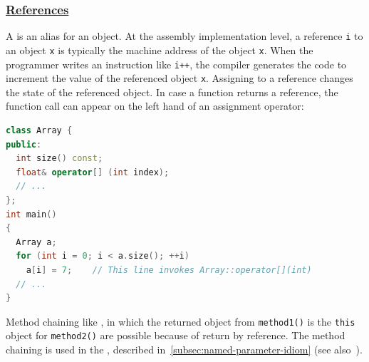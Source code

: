 \subsubsection{\href{https://isocpp.org/wiki/faq/references}{References}}
A  is an alias for an object. At the assembly 
implementation level, a reference \texttt{i} to an object \texttt{x} is 
typically the machine address of the object \texttt{x}. When the 
programmer writes an instruction like \texttt{i++}, the compiler generates 
the code to increment the value of the referenced object \texttt{x}.
\newline
Assigning to a reference changes the state of the referenced object.
\newline
In case a function returns a reference, the function call can appear 
on the left hand of an assignment operator:
\begin{lstlisting}[language=C++]
class Array {
public:
  int size() const;
  float& operator[] (int index);
  // ...
};
int main()
{
  Array a;
  for (int i = 0; i < a.size(); ++i)
    a[i] = 7;    // This line invokes Array::operator[](int)
  // ...
}
\end{lstlisting}
Method chaining like , in which 
the returned object from \texttt{method1()} is the \texttt{this} object 
for \texttt{method2()} are possible because of return by reference.
\newline
The method chaining is used in the , 
described in~\ref{subsec:named-parameter-idiom} (see also~\cite{isocpp-named-parameter-idiom}).

